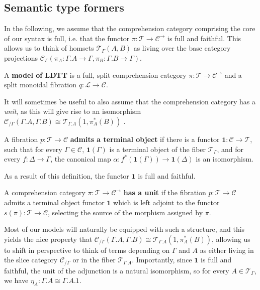 \documentclass[a4paper,english]{lipics-v2018}
\begin{document}
\subsection{Semantic type formers}\label{semtypform}
In the following, we assume that the comprehension category comprising the core of our syntax is full, i.e. that the functor $\pi : \mathcal{T} \to \mathcal{C}^{\to}$ is full and faithful. This allows us to think of homsets $\mathcal{T}_\Gamma(A, B)$ as living over the base category projections $\mathcal{C}_\Gamma(\pi_A : \Gamma.A \to \Gamma, \pi_B : \Gamma.B \to \Gamma)$.
\begin{definition}A \textbf{model of LDTT} is a full, split comprehension category $\pi : \mathcal{T} \to \mathcal{C}^{\to}$ and a split monoidal fibration $q : \mathcal{L} \to \mathcal{C}$.\\
\end{definition}
  It will sometimes be useful to also assume that the comprehension category has a \textit{unit}, as this will give rise to an isomorphism $\mathcal{C}_{/\Gamma}(\Gamma.A, \Gamma.B) \cong \mathcal{T}_{\Gamma.A}(1, \pi^*_A(B))$ \cite{jacobs}.
\begin{definition}
    A fibration $p : \mathcal{T} \to \mathcal{C}$ \textbf{admits a terminal object} if there is a functor $\mathbf{1} : \mathcal{C} \to \mathcal{T}$, such that for every $\Gamma \in \mathcal{C}$, $\mathbf{1}(\Gamma)$ is a terminal object of the fiber $\mathcal{T}_{\Gamma}$, and for every $f : \Delta \to \Gamma$, the canonical map $\alpha : f^*(\mathbf{1}(\Gamma)) \to \mathbf{1}(\Delta)$ is an isomorphism.
  \end{definition}
  As a result of this definition, the functor $\mathbf{1}$ is full and faithful.
  \begin{definition}
    A comprehension category $\pi : \mathcal{T} \to \mathcal{C}^{\to}$ \textbf{has a unit} if the fibration $p : \mathcal{T} \to \mathcal{C}$ admits a terminal object functor $\mathbf{1}$ which is left adjoint to the functor $s(\pi) : \mathcal{T} \to \mathcal{C}$, selecting the source of the morphism assigned by $\pi$.
  \end{definition}
  Most of our models will naturally be equipped with such a structure, and this yields the nice property that $\mathcal{C}_{/\Gamma}(\Gamma.A, \Gamma.B) \cong \mathcal{T}_{\Gamma.A}(1, \pi_A^*(B))$, allowing us to shift in perspective to think of terms depending on $\Gamma$ and $A$ as either living in the slice category $\mathcal{C}_{/\Gamma}$ or in the fiber $\mathcal{T}_{\Gamma.A}$. Importantly, since $\mathbf{1}$ is full and faithful, the unit of the adjunction is a natural isomorphism, so for every $A \in \mathcal{T}_\Gamma$, we have $\eta_A : \Gamma.A \cong \Gamma.A.1$.
\end{document}
